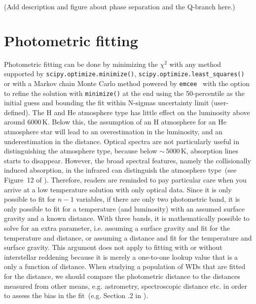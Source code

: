 \documentclass[fleqn,usenatbib]{rasti}
\begin{document}
(Add description and figure about phase separation and the Q-branch here.)

\section{Photometric fitting}
Photometric fitting can be done by minimizing the $\chi^2$ with any method
supported by \verb+scipy.optimize.minimize()+,
\verb+scipy.optimize.least_squares()+ or with a Markov chain Monte
Carlo method powered by \texttt{emcee}~\citep{2013PASP..125..306F} with the
option to refine the solution with \verb+minimize()+ at the end using the
50-percentile as the initial guess and bounding the fit within N-sigmas
uncertainty limit (user-defined). The H and He atmosphere type has little
effect on the luminosity above around $6000$\,K. Below this, the assumption of
an H atmosphere for an He atmosphere star will lead to an overestimation in
the luminosity, and an underestimation in the distance. Optical spectra are
not particularly useful in distinguishing the atmosphere type, because below
$\sim$\,$5000$\,K, absorption lines starts to disappear. However, the
broad spectral features, namely the collisionally induced absorption, in the
infrared can distinguish the atmosphere type~(see Figure~12 of
\citealt{2017ApJ...848...36B}). Therefore, readers are reminded to pay
particular care when you arrive at a low temperature solution with only
optical data. Since it is only possible to fit for $n-1$ variables, if there
are only two photometric band, it is only possible to fit for a temperature
(and luminosity) with an assumed surface gravity and a known distance. With
three bands, it is mathematically possible to solve for an extra parameter,
i.e. assuming a surface gravity and fit for the temperature and distance,
or assuming a distance and fit for the temperature and surface gravity.
This argument does not apply to fitting with or without interstellar reddening
because it is merely a one-to-one lookup value that is a only a function of
distance. When studying a population of WDs that are fitted for the
distance, we should compare the photometric distance to the distances measured
from other means, e.g. astrometry, spectroscopic distance etc. in order to
assess the bias in the fit~(e.g. Section .2
in \citealt{2011MNRAS.417...93R}).
\end{document}
